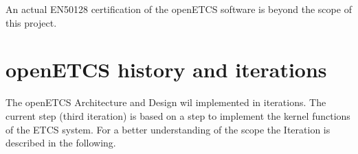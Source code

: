 An actual EN50128 certification of the openETCS software is beyond the scope of this project.


%
%



\section{openETCS history and iterations}
The openETCS Architecture and Design wil implemented in iterations. The current step (third iteration) is based on a step to implement the kernel functions of the ETCS system. For a better understanding of the scope the Iteration is described in the following.

